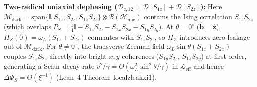 \documentclass[onecolumn,10pt,notitlepage,amsmath,amssymb,floatfix]{revtex4-2}
\theoremstyle{plain}
\theoremstyle{definition}
\newcommand{\PS}{P_S}
\newcommand{\HZ}{H_Z}
\newcommand{\DeltaPhi}{\Delta\Phi_S}
\newcommand{\leanid}[1]{{\footnotesize\ttfamily\def\_{\textunderscore\allowbreak}#1}}
\begin{document}
\textbf{Two-radical uniaxial dephasing ($\mathcal{D}_{z,12} = \mathcal{D}[S_{1z}] + \mathcal{D}[S_{2z}]$):} Here $\mathcal{M}_{\mathrm{dark}} = \mathrm{span}\{\mathbb{I}, S_{1z}, S_{2z}, S_{1z}S_{2z}\} \otimes \mathcal{B}(\mathcal{H}_{\mathrm{nuc}})$ contains the Ising correlation $S_{1z}S_{2z}$ (which overlaps $\PS = \frac{1}{4}\mathbb{I} - S_{1z}S_{2z} - S_{1x}S_{2x} - S_{1y}S_{2y}$). At $\theta = 0^\circ$ ($\hat{\mathbf{b}} = \hat{\mathbf{z}}$), $\HZ(0) = \omega_L(S_{1z}+S_{2z})$ commutes with $S_{1z}S_{2z}$, so $\HZ$ introduces zero leakage out of $\mathcal{M}_{\mathrm{dark}}$. For $\theta \neq 0^\circ$, the transverse Zeeman field $\omega_L\sin\theta(S_{1x}+S_{2x})$ couples $S_{1z}S_{2z}$ directly into bright $x,y$ coherences ($S_{1y}S_{2z}$, $S_{1z}S_{2y}$) at first order, generating a Schur decay rate $v^2/\gamma = O(\omega_L^2 \sin^2\theta / \gamma)$ in $\mathcal{L}_{\mathrm{eff}}$ and hence $\DeltaPhi = \Theta(\xi^{-1})$ (Lean~4 Theorem~\leanid{local\_z\_leak\_xi1}).
\end{document}
